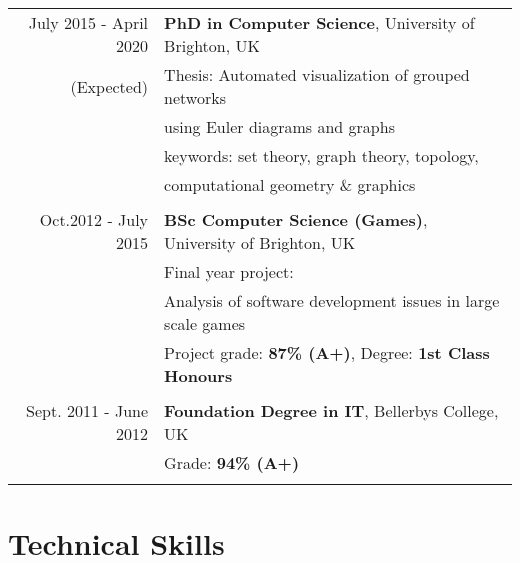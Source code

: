 \documentclass[a4paper,11pt]{article} %
\begin{document}
\begin{tabular}{r|p{11cm}}
July 2015 - April 2020 & \textbf{PhD in Computer Science}, University of Brighton, UK\\
(Expected)& Thesis: Automated visualization of grouped networks\\
& using Euler diagrams and graphs\\
& keywords: set theory, graph theory, topology,\\
& computational geometry \& graphics \\
\multicolumn{2}{c}{} \\

	
Oct.2012 - July 2015 & \textbf{BSc Computer Science (Games)}, University of Brighton, UK\\
& Final year project: \\
& Analysis of software development issues in large scale games\\
&\normalsize Project grade: \textbf{87\% (A+)}, Degree: \textbf{1st Class Honours} \\
\multicolumn{2}{c}{} \\


Sept. 2011 - June 2012 & \textbf{Foundation Degree in IT}, Bellerbys College, UK\\
&\normalsize Grade: \textbf{94\% (A+)} \\
\multicolumn{2}{c}{} \\

\end{tabular}








\section{Technical Skills}
\end{document}
